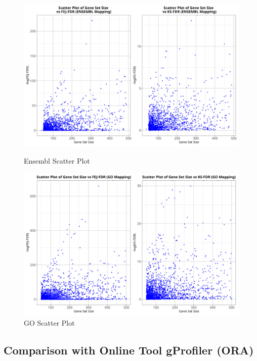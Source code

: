 \documentclass[12pt]{article}
\begin{document}
\begin{figure}[htpb]
    \centering
    \begin{minipage}{0.49\textwidth}
        \centering
        \includegraphics[width=\textwidth]{./plots/ensScatt.png}
        \caption{Ensembl Scatter Plot}
        \label{fig:ens-scatt}
    \end{minipage}
    \hfill
    \begin{minipage}{0.49\textwidth}
        \centering
        \includegraphics[width=\textwidth]{./plots/goScatt.png}
        \caption{GO Scatter Plot}
        \label{fig:go-scatt}
    \end{minipage}
\end{figure}

\subsection{Comparison with Online Tool gProfiler (ORA)}\label{sec:Comparison-of-ORA}
\end{document}
